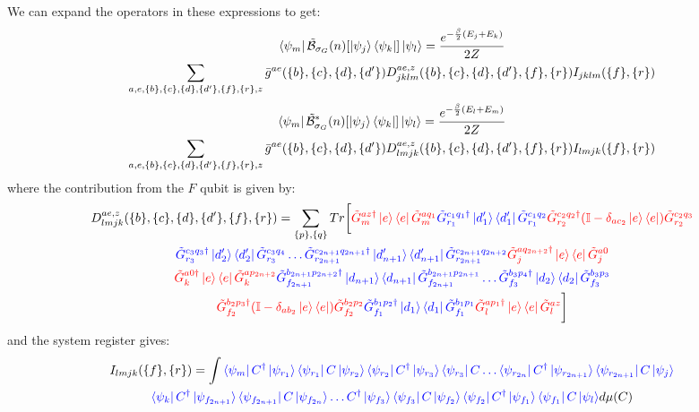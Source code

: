We can expand the operators in these expressions to get:
\begin{multline}
    \bra{\psi_m}\tilde{\mathcal{B}}_{\sigma_G}(n)[\ket{\psi_j}\bra{\psi_k}]\ket{\psi_l} = \frac{e^{-\frac{\beta}{2}(E_j+E_k)}}{2Z}\\\sum_{a,e,\{b\},\{c\},\{d\},\{d'\},\{f\},\{r\},z} \bar g^{ae}(\{b\},\{c\},\{d\},\{d'\}) D^{ae,z}_{jklm}(\{b\},\{c\},\{d\},\{d'\},\{f\},\{r\})I_{jklm}(\{f\},\{r\})
    \label{eq:def}
\end{multline}
\begin{multline}
    \bra{\psi_m}\tilde{\mathcal{B}}^*_{\sigma_G}(n)[\ket{\psi_j}\bra{\psi_k}]\ket{\psi_l} = \frac{e^{-\frac{\beta}{2}(E_l+E_m)}}{2Z}\\\sum_{a,e,\{b\},\{c\},\{d\},\{d'\},\{f\},\{r\},z} \bar g^{ae}(\{b\},\{c\},\{d\},\{d'\}) D^{ae,z}_{lmjk}(\{b\},\{c\},\{d\},\{d'\},\{f\},\{r\})I_{lmjk}(\{f\},\{r\})
    \label{eq:B*def}
\end{multline}
where the contribution from the $F$ qubit is given by:
\begin{multline}
    D^{ae,z}_{lmjk}(\{b\},\{c\},\{d\},\{d'\},\{f\},\{r\}) = 
    \sum_{\{p\},\{q\}}
Tr\bigg[\textcolor{red}{\tilde G^{az\dagger}_m\ket{e}\bra{e}\tilde G^{aq_1}_m}\textcolor{blue}{\tilde G^{c_1q_1\dagger}_{r_1}\ket{d'_1}\bra{d'_1}\tilde G^{c_1q_2}_{r_1}}\textcolor{red}{\tilde G^{c_2q_2\dagger}_{r_2}(\mathbb{I} - \delta_{ac_2}\ket{e}\bra{e})\tilde G^{c_2q_3}_{r_2}}\\\textcolor{blue}{\tilde G^{c_3q_3\dagger}_{r_3}\ket{d'_2}\bra{d'_2}\tilde G^{c_3q_4}_{r_3}\ldots
\tilde G^{c_{2n+1}q_{2n+1}\dagger}_{r_{2n+1}}\ket{d'_{n+1}}\bra{d'_{n+1}}\tilde G^{c_{2n+1}q_{2n+2}}_{r_{2n+1}}}\textcolor{red}{\tilde G^{aq_{2n+2}\dagger}_j\ket{e}\bra{e}\tilde G^{a0}_j}\\ \textcolor{red}{\tilde G^{a0\dagger}_k\ket{e}\bra{e}\tilde G^{ap_{2n+2}}_k}\textcolor{blue}{\tilde G^{b_{2n+1}p_{2n+2}\dagger}_{f_{2n+1}}\ket{d_{n+1}}\bra{d_{n+1}}\tilde G^{b_{2n+1}p_{2n+1}}_{f_{2n+1}}\ldots \tilde G^{b_3p_4\dagger}_{f_3}\ket{d_2}\bra{d_2}\tilde G^{b_3p_3}_{f_3}}\\\textcolor{red}{\tilde G^{b_2p_3\dagger}_{f_2}(\mathbb{I} - \delta_{ab_2}\ket{e}\bra{e})\tilde G^{b_2p_2}_{f_2}}\textcolor{blue}{\tilde G^{b_1p_2\dagger}_{f_1}\ket{d_1}\bra{d_1}\tilde G^{b_1p_1}_{f_1}}\textcolor{red}{\tilde G^{ap_1\dagger}_l\ket{e}\bra{e}\tilde G^{az}_l}\bigg]
\end{multline}
and the system register gives:
\begin{multline}
I_{lmjk}(\{f\},\{r\})=\int \textcolor{blue}{\bra{\psi_m}C^{\dagger}\ket{\psi_{r_1}}\bra{\psi_{r_1}}C\ket{\psi_{r_2}}\bra{\psi_{r_2}}C^{\dagger}\ket{\psi_{r_3}}\bra{\psi_{r_3}}C\ldots \bra{\psi_{r_{2n}}}C^{\dagger}\ket{\psi_{r_{2n+1}}}\bra{\psi_{r_{2n+1}}}C\ket{\psi_{j}}}\\\textcolor{blue}{
\bra{\psi_{k}}C^{\dagger}\ket{\psi_{f_{2n+1}}}\bra{\psi_{f_{2n+1}}}C\ket{\psi_{f_{2n}}}\ldots C^{\dagger}\ket{\psi_{f_3}}\bra{\psi_{f_3}}C\ket{\psi_{f_2}}\bra{\psi_{f_2}}C^{\dagger}\ket{\psi_{f_1}}\bra{\psi_{f_1}}C\ket{\psi_l}}d\mu(C)
\end{multline}
